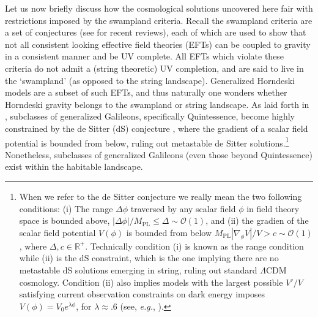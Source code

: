 \documentclass[amsmath,amssymb,11pt]{article}
\begin{document}
Let us now briefly discuss how the cosmological solutions uncovered here fair with restrictions imposed by the swampland criteria. Recall the swampland criteria are a set of conjectures \cite{Vafa:2005ui,Ooguri:2006in} (see \cite{Palti:2019pca,vanBeest:2021lhn} for recent reviews), each of which are used to show that not all consistent looking effective field theories (EFTs) can be coupled to gravity in a consistent manner and be UV complete. All EFTs which violate these criteria do not admit a (string theoretic) UV completion, and are said to live in the `swampland' (as opposed to the string landscape). Generalized Horndeski models are a subset of such EFTs, and thus naturally one wonders whether Horndeski gravity belongs to the swampland or string landscape. As laid forth in \cite{Heisenberg:2019qxz,Brahma:2019kch}, subclasses of generalized Galileons, specifically Quintessence, become highly constrained by the de Sitter (dS) conjecture  \cite{Agrawal:2018own,Obied:2018sgi}, where the gradient of a scalar field potential is bounded from below, ruling out metastable de Sitter solutions.\footnote{When we refer to the de Sitter conjecture we really mean the two following conditions: (i) The range $\Delta\phi$ traversed by any scalar field $\phi$ in field theory space is bounded above, $|\Delta\phi|/M_{\text{PL}}\leq \Delta\sim\mathcal{O}(1)$, and (ii) the gradien of the scalar field potential $V(\phi)$ is bounded from below $M_{\text{PL}}|\nabla_{\phi}V|/V>c\sim\mathcal{O}(1)$, where $\Delta,c\in\mathbb{R}^{+}$. Technically condition (i) is known as the range condition while (ii) is the dS constraint, which is the one implying there are no metastable dS solutions emerging in string, ruling out standard $\Lambda$CDM cosmology. Condition (ii) also implies models with the largest possible $V'/V$ satisfying current observation constraints on dark energy imposes $V(\phi)=V_{0}e^{\lambda\phi}$, for $\lambda\approx.6$ (see, \emph{e.g.}, \cite{Agrawal:2018own}).} Nonetheless, subclasses of generalized Galileons (even those beyond Quintessence) exist within the habitable landscape.
\end{document}
